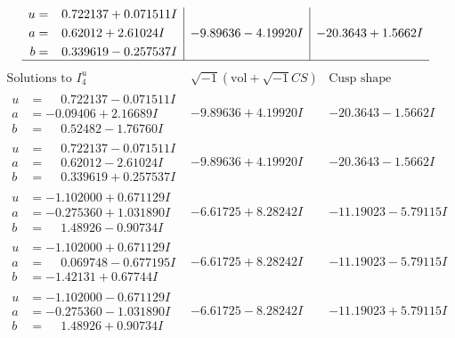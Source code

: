 \documentclass[1p]{elsarticle_modified}
\theoremstyle{definition}
\newcommand{\I}{\sqrt{-1}}
\begin{document}
$$\begin{array}{c|c|c}
\begin{aligned}
u &= \phantom{-}0.722137 + 0.071511 I \\
a &= \phantom{-}0.62012 + 2.61024 I \\
b &= \phantom{-}0.339619 - 0.257537 I\end{aligned}
 & -9.89636 - 4.19920 I & -20.3643 + 1.5662 I\\
 \hline 
 \end{array}$$\newpage$$\begin{array}{c|c|c}  
\text{Solutions to }I^u_{4}& \I (\text{vol} + \sqrt{-1}CS) & \text{Cusp shape}\\
 \hline 
\begin{aligned}
u &= \phantom{-}0.722137 - 0.071511 I \\
a &= -0.09406 + 2.16689 I \\
b &= \phantom{-}0.52482 - 1.76760 I\end{aligned}
 & -9.89636 + 4.19920 I & -20.3643 - 1.5662 I \\ \hline\begin{aligned}
u &= \phantom{-}0.722137 - 0.071511 I \\
a &= \phantom{-}0.62012 - 2.61024 I \\
b &= \phantom{-}0.339619 + 0.257537 I\end{aligned}
 & -9.89636 + 4.19920 I & -20.3643 - 1.5662 I \\ \hline\begin{aligned}
u &= -1.102000 + 0.671129 I \\
a &= -0.275360 + 1.031890 I \\
b &= \phantom{-}1.48926 - 0.90734 I\end{aligned}
 & -6.61725 + 8.28242 I & -11.19023 - 5.79115 I \\ \hline\begin{aligned}
u &= -1.102000 + 0.671129 I \\
a &= \phantom{-}0.069748 - 0.677195 I \\
b &= -1.42131 + 0.67744 I\end{aligned}
 & -6.61725 + 8.28242 I & -11.19023 - 5.79115 I \\ \hline\begin{aligned}
u &= -1.102000 - 0.671129 I \\
a &= -0.275360 - 1.031890 I \\
b &= \phantom{-}1.48926 + 0.90734 I\end{aligned}
 & -6.61725 - 8.28242 I & -11.19023 + 5.79115 I \\ \hline\begin{aligned}

\end{aligned}
\end{array}$$
\end{document}
